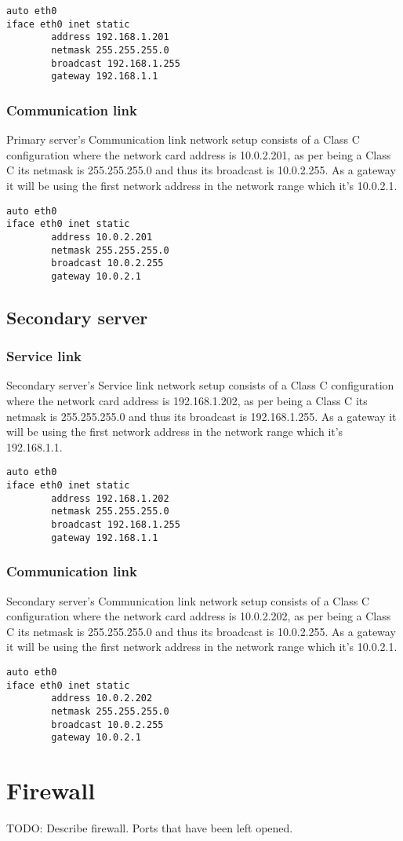 \begin{verbatim}
auto eth0
iface eth0 inet static
        address 192.168.1.201
        netmask 255.255.255.0
        broadcast 192.168.1.255
        gateway 192.168.1.1
\end{verbatim}

\subsubsection {Communication link}
Primary server's Communication link network setup consists of a Class C configuration where the network card address is 10.0.2.201, as per being a Class C its netmask is 255.255.255.0 and thus its broadcast is 10.0.2.255. As a gateway it will be using the first network address in the network range which it's 10.0.2.1.

\begin{verbatim}
auto eth0
iface eth0 inet static
        address 10.0.2.201
        netmask 255.255.255.0
        broadcast 10.0.2.255
        gateway 10.0.2.1
\end{verbatim}
\subsection {Secondary server}
\subsubsection {Service link}
Secondary server's Service link network setup consists of a Class C configuration where the network card address is 192.168.1.202, as per being a Class C its netmask is 255.255.255.0 and thus its broadcast is 192.168.1.255. As a gateway it will be using the first network address in the network range which it's 192.168.1.1.

\begin{verbatim}
auto eth0
iface eth0 inet static
        address 192.168.1.202
        netmask 255.255.255.0
        broadcast 192.168.1.255
        gateway 192.168.1.1
\end{verbatim}

\subsubsection {Communication link}
Secondary server's Communication link network setup consists of a Class C configuration where the network card address is 10.0.2.202, as per being a Class C its netmask is 255.255.255.0 and thus its broadcast is 10.0.2.255. As a gateway it will be using the first network address in the network range which it's 10.0.2.1.

\begin{verbatim}
auto eth0
iface eth0 inet static
        address 10.0.2.202
        netmask 255.255.255.0
        broadcast 10.0.2.255
        gateway 10.0.2.1
\end{verbatim}

\section {Firewall}

TODO: Describe firewall. Ports that have been left opened.


